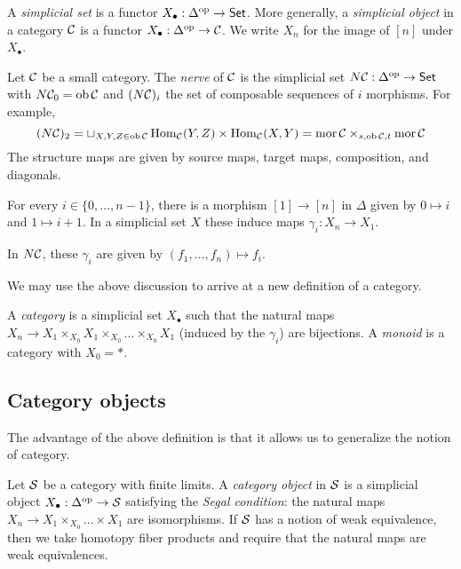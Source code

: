 \begin{dfn}
	A \emph{simplicial set} is a functor $X_\bullet: \Delta^{\mathrm{op}} \to \mathsf{Set}$.
	More generally, a \emph{simplicial object} in a category $\mathcal{C}$ is a functor $X_\bullet: \Delta^{\mathrm{op}} \to \mathcal{C}$.
	We write $X_n$ for the image of $[n]$ under $X_\bullet$.
\end{dfn}

\begin{ex}
	Let $\mathcal{C}$ be a small category.
	The \emph{nerve} of $\mathcal{C}$ is the simplicial set $N\mathcal{C}: \Delta^{\mathrm{op}} \to \mathsf{Set}$ with $N\mathcal{C}_0 = \operatorname{ob} \mathcal{C}$ and $(N \mathcal{C})_i$ the set of composable sequences of $i$ morphisms.
	For example,
	\[
		(N\mathcal{C})_2 = \sqcup_{X,Y,Z \in \operatorname{ob} \mathcal{C}} \operatorname{Hom}_{\mathcal{C}}(Y, Z) \times \operatorname{Hom}_{\mathcal{C}}(X, Y) = \operatorname{mor} \mathcal{C} \times_{s,\operatorname{ob} \mathcal{C},t} \operatorname{mor} \mathcal{C}
	\]
	The structure maps are given by source maps, target maps, composition, and diagonals.
\end{ex}

For every $i \in \{0, \dots, n-1\}$, there is a morphism $[1] \to [n]$ in $\Delta$ given by $0 \mapsto i$ and $1 \mapsto i+1$.
In a simplicial set $X$ these induce maps $\gamma_i: X_n \to X_1$.

\begin{ex}
	In $N \mathcal{C}$, these $\gamma_i$ are given by $(f_1, \dots, f_n) \mapsto f_i$.
\end{ex}

We may use the above discussion to arrive at a new definition of a category.

\begin{dfn}
	A \emph{category} is a simplicial set $X_\bullet$ such that the natural maps $X_n \to X_1 \times_{X_0} X_1 \times_{X_0} \dots \times_{X_0} X_1$ (induced by the $\gamma_i$) are bijections.
	A \emph{monoid} is a category with $X_0 = *$.
\end{dfn}

\subsection{Category objects}

The advantage of the above definition is that it allows us to generalize the notion of category.

\begin{dfn}
	Let $\mathcal{S}$ be a category with finite limits. 
	A \emph{category object} in $\mathcal{S}$ is a simplicial object $X_\bullet: \Delta^{\mathrm{op}} \to \mathcal{S}$ satisfying the \emph{Segal condition}: the natural maps $X_n \to X_1 \times_{X_0} \dots \times X_1$ are isomorphisms.
	If $\mathcal{S}$ has a notion of weak equivalence, then we take homotopy fiber products and require that the natural maps are weak equivalences.
\end{dfn}

